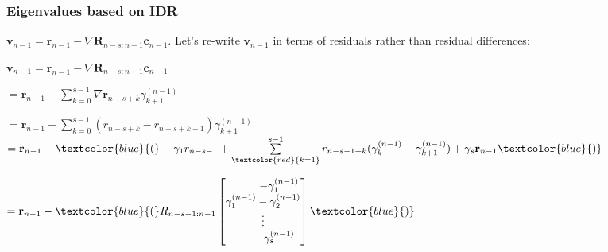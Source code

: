 \documentclass[mathserif]{beamer}
\begin{document}
\begin{frame}
\frametitle{Eigenvalues based on IDR}
$\mathbf{v}_{n-1}=\mathbf{r}_{n-1}-\nabla \mathbf{R}_{n-s:n-1}\mathbf{c}_{n-1}$. Let's re-write $\mathbf{v}_{n-1}$ in terms of residuals rather than residual differences:\\

\pause
\vspace{.1in}

$\mathbf{v}_{n-1} = \mathbf{r}_{n-1}-\nabla \mathbf{R}_{n-s:n-1}\mathbf{c}_{n-1}$ \\
\vspace{.1in}

\hspace{.3in} $ = \mathbf{r}_{n-1} - \sum _{k=0}^{s-1} \nabla \mathbf{r}_{n-s+k} \gamma_{k+1}^{(n-1)} $\\


\vspace{.1in}

\hspace{.35in}$= \mathbf{r}_{n-1} - \sum _{k=0}^{s-1} (r_{n-s+k} - r_{n-s+k-1}) \gamma_{k+1}^{(n-1)}$\\

\pause
\vspace{.1in}  
$=\mathbf{r}_{n-1}  - \textcolor{blue}{(} -\gamma_1r_{n-s-1} + \sum \limits _{\textcolor{red}{k=1}}^{s-1}  r_{n-s-1+k}   ( \gamma_k^{(n-1)}  - \gamma_{k+1}^{(n-1)}) + \gamma_s\mathbf{r}_{n-1} \textcolor{blue}{)} $

\vspace{.1in}  

\pause

$= \mathbf{r}_{n-1} -\textcolor{blue}{(}  R_{n-s-1:n-1} \begin{bmatrix}
\hspace{.4in} -\gamma_1^{(n-1)}    \\ 
  \gamma_1^{(n-1)}- \gamma_2^{(n-1)} \\
 \vdots \\
\hspace{.4in}\gamma_s^{(n-1)} 

     \end{bmatrix}\textcolor{blue}{)}$
\end{frame}
\end{document}
